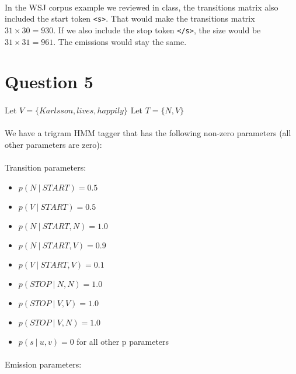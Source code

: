 \documentclass{article}
\newcommand\given[1][]{\:#1\vert\:}
\begin{document}
\paragraph{} In the WSJ corpus example we reviewed in class, the transitions matrix also included the start token \texttt{<s>}. That would make the transitions matrix $31 \times 30 = 930$. If we also include the stop token \texttt{</s>}, the size would be $31 \times 31 = 961$. The emissions would stay the same.

\clearpage

\section*{Question 5}

\paragraph{} Let $V = \{ Karlsson,lives,happily \}$ Let $T = \{ N,V \}$

\paragraph{} We have a trigram HMM tagger that has the following non-zero parameters (all other parameters are zero):

\paragraph{} Transition parameters:

\begin{itemize}
    \item $p(N \given START) = 0.5$
    \item $p(V \given START) = 0.5$
    \item $p(N \given START,N) = 1.0$
    \item $p(N \given START,V) = 0.9$
    \item $p(V \given START,V) = 0.1$
    \item $p(STOP \given N,N) = 1.0$
    \item $p(STOP \given V,V) = 1.0$
    \item $p(STOP \given V,N) = 1.0$
    \item $p(s \given u,v) = 0$ for all other p parameters
\end{itemize}

\paragraph{} Emission parameters:
\end{document}
